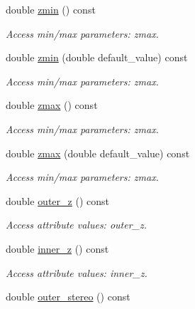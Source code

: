 \begin{DoxyCompactItemize}
double \hyperlink{struct_d_d4hep_1_1_x_m_l_1_1_dimension_aa701509f25a3c37cf93fd8d41c8d43f2}{zmin} () const 
\begin{DoxyCompactList}\small\item\em Access min/max parameters: zmax. \item\end{DoxyCompactList}\item 
double \hyperlink{struct_d_d4hep_1_1_x_m_l_1_1_dimension_a1debe4a51973d666f808073a38bdb919}{zmin} (double default\_\-value) const 
\begin{DoxyCompactList}\small\item\em Access min/max parameters: zmax. \item\end{DoxyCompactList}\item 
double \hyperlink{struct_d_d4hep_1_1_x_m_l_1_1_dimension_a02f670fff4ff1627a5899ff79573882d}{zmax} () const 
\begin{DoxyCompactList}\small\item\em Access min/max parameters: zmax. \item\end{DoxyCompactList}\item 
double \hyperlink{struct_d_d4hep_1_1_x_m_l_1_1_dimension_a573dd0e45d8c96c04d439d3f3dff71c5}{zmax} (double default\_\-value) const 
\begin{DoxyCompactList}\small\item\em Access min/max parameters: zmax. \item\end{DoxyCompactList}\item 
double \hyperlink{struct_d_d4hep_1_1_x_m_l_1_1_dimension_ae3bb77f72bbfe8d55e90f2f1fe20457a}{outer\_\-z} () const 
\begin{DoxyCompactList}\small\item\em Access attribute values: outer\_\-z. \item\end{DoxyCompactList}\item 
double \hyperlink{struct_d_d4hep_1_1_x_m_l_1_1_dimension_a8b6647f4fbc2a6a91c441f796e6a1b4b}{inner\_\-z} () const 
\begin{DoxyCompactList}\small\item\em Access attribute values: inner\_\-z. \item\end{DoxyCompactList}\item 
double \hyperlink{struct_d_d4hep_1_1_x_m_l_1_1_dimension_aca3b0a91c8433347ee0f059c14b78f2c}{outer\_\-stereo} () const 

\end{DoxyCompactItemize}
